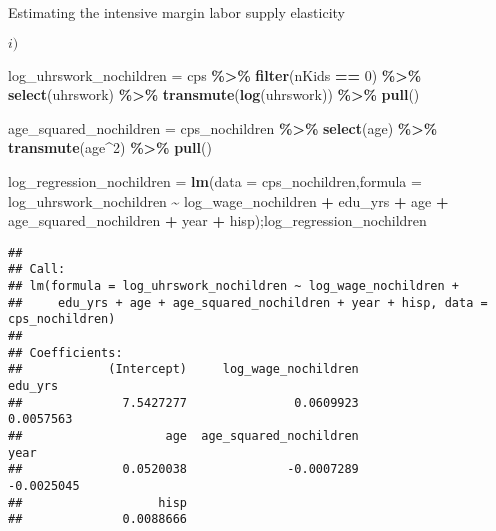 \documentclass[
  ignorenonframetext,
]{beamer}
\newenvironment{Shaded}{\begin{snugshade}}{\end{snugshade}}
\newcommand{\DataTypeTok}[1]{\textcolor[rgb]{0.13,0.29,0.53}{#1}}
\newcommand{\DecValTok}[1]{\textcolor[rgb]{0.00,0.00,0.81}{#1}}
\newcommand{\KeywordTok}[1]{\textcolor[rgb]{0.13,0.29,0.53}{\textbf{#1}}}
\newcommand{\NormalTok}[1]{#1}
\newcommand{\OperatorTok}[1]{\textcolor[rgb]{0.81,0.36,0.00}{\textbf{#1}}}
\newcommand{\StringTok}[1]{\textcolor[rgb]{0.31,0.60,0.02}{#1}}
\begin{document}
\begin{frame}[fragile]{Estimating the intensive margin labor supply
elasticity}
\begin{block}{\(i)\)}
\begin{Shaded}
\begin{Highlighting}[]
\NormalTok{log\_uhrswork\_nochildren =}\StringTok{ }\NormalTok{cps }\OperatorTok{\%\textgreater{}\%}
\StringTok{  }\KeywordTok{filter}\NormalTok{(nKids }\OperatorTok{==}\StringTok{ }\DecValTok{0}\NormalTok{) }\OperatorTok{\%\textgreater{}\%}
\StringTok{  }\KeywordTok{select}\NormalTok{(uhrswork) }\OperatorTok{\%\textgreater{}\%}
\StringTok{  }\KeywordTok{transmute}\NormalTok{(}\KeywordTok{log}\NormalTok{(uhrswork)) }\OperatorTok{\%\textgreater{}\%}
\StringTok{  }\KeywordTok{pull}\NormalTok{()}

\NormalTok{age\_squared\_nochildren =}\StringTok{ }\NormalTok{cps\_nochildren }\OperatorTok{\%\textgreater{}\%}
\StringTok{  }\KeywordTok{select}\NormalTok{(age) }\OperatorTok{\%\textgreater{}\%}
\StringTok{  }\KeywordTok{transmute}\NormalTok{(age}\OperatorTok{\^{}}\DecValTok{2}\NormalTok{) }\OperatorTok{\%\textgreater{}\%}
\StringTok{  }\KeywordTok{pull}\NormalTok{()}
\end{Highlighting}
\end{Shaded}

\begin{Shaded}
\begin{Highlighting}[]
\NormalTok{log\_regression\_nochildren =}\StringTok{ }\KeywordTok{lm}\NormalTok{(}\DataTypeTok{data =}\NormalTok{ cps\_nochildren,}\DataTypeTok{formula =}\NormalTok{ log\_uhrswork\_nochildren }\OperatorTok{\textasciitilde{}}\StringTok{ }\NormalTok{log\_wage\_nochildren }\OperatorTok{+}\StringTok{ }\NormalTok{edu\_yrs }\OperatorTok{+}\StringTok{ }\NormalTok{age }\OperatorTok{+}\StringTok{ }\NormalTok{age\_squared\_nochildren }\OperatorTok{+}\StringTok{ }\NormalTok{year }\OperatorTok{+}\StringTok{ }\NormalTok{hisp);log\_regression\_nochildren}
\end{Highlighting}
\end{Shaded}

\begin{verbatim}
## 
## Call:
## lm(formula = log_uhrswork_nochildren ~ log_wage_nochildren + 
##     edu_yrs + age + age_squared_nochildren + year + hisp, data = cps_nochildren)
## 
## Coefficients:
##            (Intercept)     log_wage_nochildren                 edu_yrs  
##              7.5427277               0.0609923               0.0057563  
##                    age  age_squared_nochildren                    year  
##              0.0520038              -0.0007289              -0.0025045  
##                   hisp  
##              0.0088666
\end{verbatim}

\hfill\break


\end{block}
\end{frame}
\end{document}

